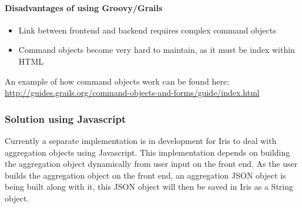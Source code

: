\documentclass[12pt,a4paper,titlepage]{report}
\begin{document}
\paragraph{Disadvantages of using Groovy/Grails}
\begin{itemize}
  \item Link between frontend and backend requires complex command objects
  \item Command objects become very hard to maintain, as it must be index within HTML
\end{itemize}
An example of how command objects work can be found here:
\newline
\url{http://guides.grails.org/command-objects-and-forms/guide/index.html}
\subsubsection{Solution using Javascript}
Currently a separate implementation is in development for Iris to deal with aggregation objects using Javascript. This implementation depends on building the aggregation object dynamically from user input on the front end. As the user builds the aggregation object on the front end, an aggregation JSON object is being built along with it, this JSON object will then be saved in Iris as a String object.
\end{document}
